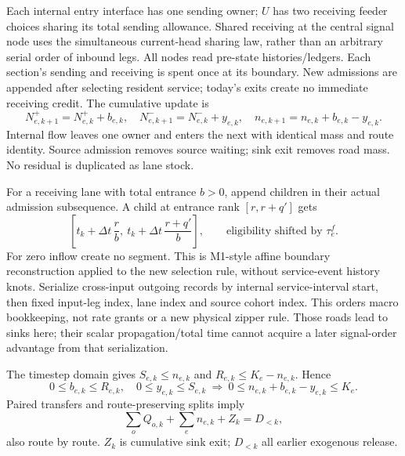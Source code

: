 \documentclass[10pt,a4paper]{article}
\begin{document}
Each internal entry interface has one sending owner; $U$ has two
receiving feeder choices sharing its total sending allowance. Shared receiving at the
central signal node uses the simultaneous current-head sharing law, rather
than an arbitrary serial order of inbound legs.
All nodes read pre-state histories/ledgers. Each section's sending and
receiving is spent once at its boundary. New admissions are appended
after selecting resident service; today's exits create no immediate
receiving credit. The cumulative update is
\begin{equation}
 N^+_{e,k+1}=N^+_{e,k}+b_{e,k},\quad
 N^-_{e,k+1}=N^-_{e,k}+y_{e,k},\quad
 n_{e,k+1}=n_{e,k}+b_{e,k}-y_{e,k}.
 \label{eq:state-update}
\end{equation}
Internal flow leaves one owner and enters the next with identical mass
and route identity. Source admission removes source waiting; sink exit
removes road mass. No residual is duplicated as lane stock.

For a receiving lane with total entrance $b>0$, append children in their
actual admission subsequence. A child at entrance rank $[r,r+q']$ gets
\begin{equation}
 \left[t_k+\Delta t\,\frac r b,\
       t_k+\Delta t\,\frac{r+q'}b\right],
 \qquad\text{eligibility shifted by }\tau^f_e .
 \label{eq:entry-time}
\end{equation}
For zero inflow create no segment. This is M1-style affine boundary
reconstruction applied to the new selection rule, without service-event
history knots. Serialize cross-input outgoing records by internal
service-interval start, then fixed input-leg index, lane index and source
cohort index. This orders macro bookkeeping, not rate grants or a new
physical zipper rule. Those roads lead to sinks here; their scalar
propagation/total time cannot acquire a later signal-order advantage
from that serialization.

The timestep domain gives $S_{e,k}\leq n_{e,k}$ and
$R_{e,k}\leq K_e-n_{e,k}$. Hence
\begin{equation}
 0\leq b_{e,k}\leq R_{e,k},\quad0\leq y_{e,k}\leq S_{e,k}
 \ \Longrightarrow\
 0\leq n_{e,k}+b_{e,k}-y_{e,k}\leq K_e .
 \label{eq:storage-bound}
\end{equation}
Paired transfers and route-preserving splits imply
\begin{equation}
 \sum_oQ_{o,k}+\sum_en_{e,k}+Z_k=D_{<k},
 \label{eq:mass-identity}
\end{equation}
also route by route. $Z_k$ is cumulative sink exit; $D_{<k}$ all earlier
exogenous release.
\end{document}
